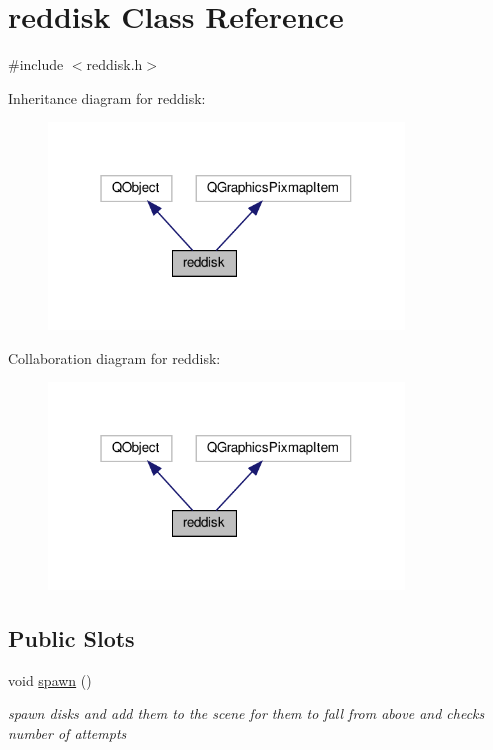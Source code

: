 \hypertarget{classreddisk}{}\section{reddisk Class Reference}
\label{classreddisk}


{\ttfamily \#include $<$reddisk.\+h$>$}



Inheritance diagram for reddisk\+:
\nopagebreak
\begin{figure}[H]
\begin{center}
\leavevmode
\includegraphics[width=268pt]{classreddisk__inherit__graph}
\end{center}
\end{figure}


Collaboration diagram for reddisk\+:
\nopagebreak
\begin{figure}[H]
\begin{center}
\leavevmode
\includegraphics[width=268pt]{classreddisk__coll__graph}
\end{center}
\end{figure}
\subsection*{Public Slots}
\begin{DoxyCompactItemize}
\item 
void \hyperlink{classreddisk_a3afadb2c0d7b5a586aeebb613bdae3dc}{spawn} ()
\begin{DoxyCompactList}\small\item\em spawn disks and add them to the scene for them to fall from above and checks number of attempts \end{DoxyCompactList}\end{DoxyCompactItemize}
